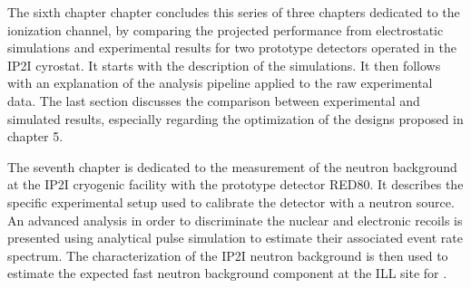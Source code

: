 The sixth chapter chapter concludes this series of three chapters dedicated to the ionization channel, by comparing the projected performance from electrostatic simulations and experimental results for two prototype detectors operated in the IP2I cyrostat. It starts with the description of the simulations. It then follows with an explanation of the analysis pipeline applied to the raw experimental data. The last section discusses the comparison between experimental and simulated results, especially regarding the optimization of the designs proposed in chapter 5.

The seventh chapter is dedicated to the measurement of the neutron background at the IP2I cryogenic facility with the prototype detector RED80. It describes the specific experimental setup used to calibrate the detector with a neutron source. An advanced analysis in order to discriminate the nuclear and electronic recoils is presented using analytical pulse simulation to estimate their associated event rate spectrum. The characterization of the IP2I neutron background is then used to estimate the expected fast neutron background component at the ILL site for \Ricochet{}.






